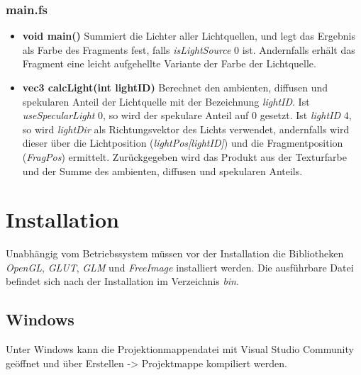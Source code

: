 \documentclass{scrartcl}
\begin{document}
            \subsubsection*{main.fs}
                \begin{itemize}
                \item \textbf{void main()}
                    Summiert die Lichter aller Lichtquellen, und legt das Ergebnis als 
                    Farbe des Fragments fest, falls \textit{isLightSource} 0 ist. 
                    Andernfalls erhält das Fragment eine leicht aufgehellte Variante der Farbe 
                    der Lichtquelle.
                \item \textbf{vec3 calcLight(int lightID)}
                    Berechnet den ambienten, diffusen und spekularen Anteil der Lichtquelle mit der 
                    Bezeichnung \textit{lightID}. Ist \textit{useSpecularLight} 0, so wird der spekulare Anteil 
                    auf 0 gesetzt. Ist \textit{lightID} 4, so wird \textit{lightDir} als Richtungsvektor 
                    des Lichts verwendet, andernfalls wird dieser über die Lichtposition (\textit{lightPos[lightID]}) 
                    und die Fragmentposition (\textit{FragPos}) ermittelt. Zurückgegeben wird das Produkt aus der 
                    Texturfarbe und der Summe des ambienten, diffusen und spekularen Anteils.
                \end{itemize}
    \newpage
    \section{Installation}
        Unabhängig vom Betriebssystem müssen vor der Installation die Bibliotheken 
        \textit{OpenGL}, \textit{GLUT}, \textit{GLM} und \textit{FreeImage} installiert 
        werden. Die ausführbare Datei befindet sich nach der Installation im Verzeichnis 
        \textit{bin}.
        \subsection{Windows} %
            Unter Windows kann die Projektionmappendatei mit Visual Studio Community 
            geöffnet und über Erstellen -> Projektmappe kompiliert werden.
\end{document}
